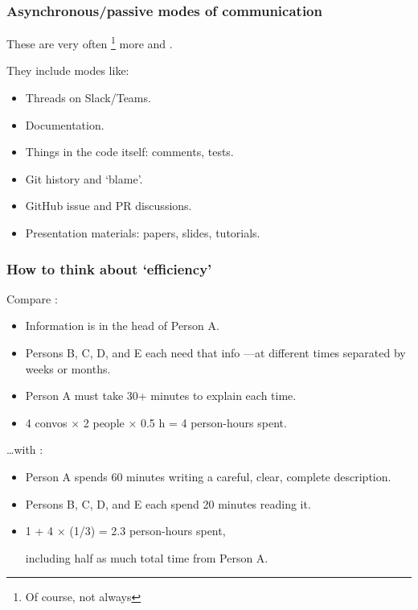 \documentclass[12pt,aspectratio=169]{beamer}
\begin{document}
\begin{frame}
\frametitle{Asynchronous/passive modes of communication}

These are very often%
\footnote{Of course, not always}%
more  and .

\bigskip
They include modes like:
\begin{itemize}
  \item Threads on Slack/Teams.
  \item Documentation.
  \item Things in the code itself: comments, tests.
  \item Git history and ‘blame’.
  \item GitHub issue and PR discussions.
  \item Presentation materials: papers, slides, tutorials.
\end{itemize}
\end{frame}

\begin{frame}
\frametitle{How to think about ‘efficiency’}

Compare :
\begin{itemize}
  \item Information is in the head of Person A.
  \item Persons B, C, D, and E each need that info
    —at different times separated by weeks or months.
  \item Person A must take 30+ minutes to explain each time.
  \item 4 convos × 2 people × 0.5 h = 4 person-hours spent.
\end{itemize}

\medskip
…with :
\begin{itemize}
  \item Person A spends 60 minutes writing a careful, clear, complete description.
  \item Persons B, C, D, and E each spend 20 minutes reading it.
  \item 1 + 4 × (1/3) = 2.3 person-hours spent,

    including half as much total time from Person A.
\end{itemize}
\end{frame}
\end{document}
